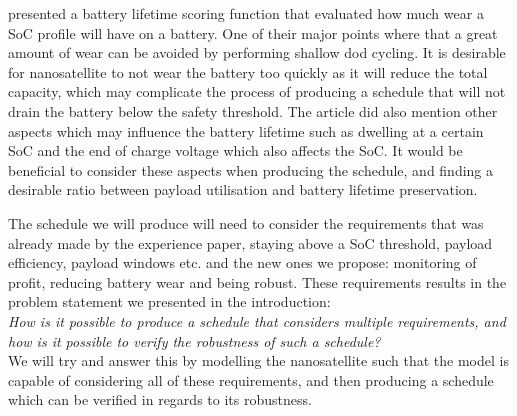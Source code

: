 \cite{score_function} presented a battery lifetime scoring function that evaluated how much wear a SoC profile will have on a battery. One of their major points where that a great amount of wear can be avoided by performing shallow \gls{dod} cycling. It is desirable for nanosatellite to not wear the battery too quickly as it will reduce the total capacity, which may complicate the process of producing a schedule that will not drain the battery below the safety threshold. The article did also mention other aspects which may influence the battery lifetime such as dwelling at a certain SoC and the end of charge voltage which also affects the SoC. It would be beneficial to consider these aspects when producing the schedule, and finding a desirable ratio between payload utilisation and battery lifetime preservation.

The schedule we will produce will need to consider the requirements that was already made by the experience paper, staying above a SoC threshold, payload efficiency, payload windows etc. and the new ones we propose: monitoring of profit, reducing battery wear and being robust. These requirements results in the problem statement we presented in the introduction:\\
\textit{How is it possible to produce a schedule that considers multiple requirements, and how is it possible to verify the robustness of such a schedule?}\\
We will try and answer this by modelling the nanosatellite such that the model is capable of considering all of these requirements, and then producing a schedule which can be verified in regards to its robustness.